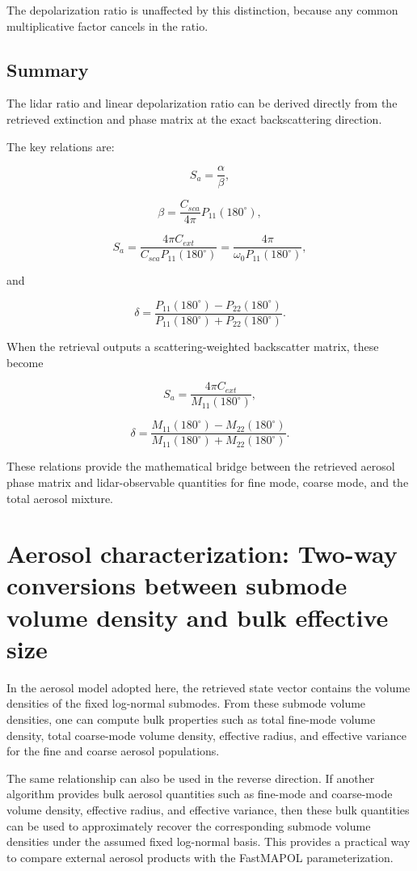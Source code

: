 \documentclass[
  letterpaper,
]{scrbook}
\begin{document}
The depolarization ratio is unaffected by this distinction, because any
common multiplicative factor cancels in the ratio.

\section{Summary}\label{summary-2}

The lidar ratio and linear depolarization ratio can be derived directly
from the retrieved extinction and phase matrix at the exact
backscattering direction.

The key relations are:

\[
S_a=\frac{\alpha}{\beta},
\]

\[
\beta=\frac{C_{sca}}{4\pi}P_{11}(180^\circ),
\]

\[
S_a=\frac{4\pi C_{ext}}{C_{sca}P_{11}(180^\circ)}
=\frac{4\pi}{\omega_0 P_{11}(180^\circ)},
\]

and

\[
\delta=
\frac{P_{11}(180^\circ)-P_{22}(180^\circ)}
{P_{11}(180^\circ)+P_{22}(180^\circ)}.
\]

When the retrieval outputs a scattering-weighted backscatter matrix,
these become

\[
S_a=\frac{4\pi C_{ext}}{M_{11}(180^\circ)},
\]

\[
\delta=
\frac{M_{11}(180^\circ)-M_{22}(180^\circ)}
{M_{11}(180^\circ)+M_{22}(180^\circ)}.
\]

These relations provide the mathematical bridge between the retrieved
aerosol phase matrix and lidar-observable quantities for fine mode,
coarse mode, and the total aerosol mixture.

\chapter{Aerosol characterization: Two-way conversions between submode
volume density and bulk effective
size}\label{aerosol-characterization-two-way-conversions-between-submode-volume-density-and-bulk-effective-size}

In the aerosol model adopted here, the retrieved state vector contains
the volume densities of the fixed log-normal submodes. From these
submode volume densities, one can compute bulk properties such as total
fine-mode volume density, total coarse-mode volume density, effective
radius, and effective variance for the fine and coarse aerosol
populations.

The same relationship can also be used in the reverse direction. If
another algorithm provides bulk aerosol quantities such as fine-mode and
coarse-mode volume density, effective radius, and effective variance,
then these bulk quantities can be used to approximately recover the
corresponding submode volume densities under the assumed fixed
log-normal basis. This provides a practical way to compare external
aerosol products with the FastMAPOL parameterization.
\end{document}

